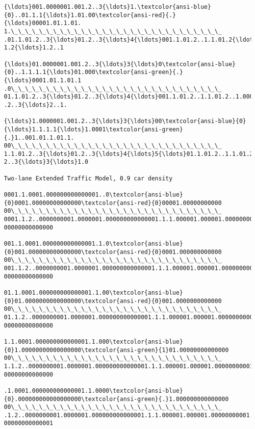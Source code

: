 \documentclass[11pt]{article}
\begin{document}
\begin{Verbatim}[commandchars=\\\{\},fontsize=\footnotesize]
{\ldots}001.0000001.001.2..3{\ldots}1.\textcolor{ansi-blue}{0}..01.1.1{\ldots}1.01.00\textcolor{ansi-red}{.}{\ldots}00001.01.1.01.
1.\_\_\_\_\_\_\_\_\_\_\_\_\_\_\_\_\_\_\_\_\_\_\_\_\_\_\_\_\_\_
.01.1.01.2..3{\ldots}01.2..3{\ldots}4{\ldots}001.1.01.2..1.1.01.2{\ldots}000001.1.0001.1.2..2..1.00
1.2{\ldots}1.2..1

{\ldots}01.0000001.001.2..3{\ldots}3{\ldots}0\textcolor{ansi-blue}{0}..1.1.1.1{\ldots}01.000\textcolor{ansi-green}{.}{\ldots}0001.01.1.01.1
.0\_\_\_\_\_\_\_\_\_\_\_\_\_\_\_\_\_\_\_\_\_\_\_\_\_\_\_\_\_\_
01.1.01.2..3{\ldots}01.2..3{\ldots}4{\ldots}001.1.01.2..1.1.01.2..1.00001.1.0001.1.2..2..1.001
.2..3{\ldots}2..1.

{\ldots}1.0000001.001.2..3{\ldots}3{\ldots}00\textcolor{ansi-blue}{0}{\ldots}1.1.1.1{\ldots}1.0001\textcolor{ansi-green}{.}1..001.01.1.01.1.
00\_\_\_\_\_\_\_\_\_\_\_\_\_\_\_\_\_\_\_\_\_\_\_\_\_\_\_\_\_\_
1.1.01.2..3{\ldots}01.2..3{\ldots}4{\ldots}5{\ldots}01.1.01.2..1.1.01.2..1.00001.1.0001.1.2..2..1.001.
2..3{\ldots}3{\ldots}1.0

Two-lane Extended Traffic Model, 0.9 car density

0001.1.0001.000000000000001..0\textcolor{ansi-blue}{0}0001.00000000000000\textcolor{ansi-red}{0}00001.00000000000
00\_\_\_\_\_\_\_\_\_\_\_\_\_\_\_\_\_\_\_\_\_\_\_\_\_\_\_\_\_\_
0001.1.2..0000000001.0000001.000000000000001.1.1.000001.000001.00000000001.1.000000000
00000000000000

001.1.0001.000000000000001.1.0\textcolor{ansi-blue}{0}001.000000000000000\textcolor{ansi-red}{0}0001.000000000000
00\_\_\_\_\_\_\_\_\_\_\_\_\_\_\_\_\_\_\_\_\_\_\_\_\_\_\_\_\_\_
001.1.2..0000000001.0000001.000000000000001.1.1.000001.000001.00000000001.1.0000000000
00000000000000

01.1.0001.000000000000001.1.00\textcolor{ansi-blue}{0}01.0000000000000000\textcolor{ansi-red}{0}001.0000000000000
00\_\_\_\_\_\_\_\_\_\_\_\_\_\_\_\_\_\_\_\_\_\_\_\_\_\_\_\_\_\_
01.1.2..0000000001.0000001.000000000000001.1.1.000001.000001.00000000001.1.00000000000
00000000000000

1.1.0001.000000000000001.1.000\textcolor{ansi-blue}{0}1.00000000000000000\textcolor{ansi-green}{1}01.00000000000000
00\_\_\_\_\_\_\_\_\_\_\_\_\_\_\_\_\_\_\_\_\_\_\_\_\_\_\_\_\_\_
1.1.2..0000000001.0000001.000000000000001.1.1.000001.000001.00000000001.1.000000000000
00000000000000

.1.0001.000000000000001.1.0000\textcolor{ansi-blue}{0}.000000000000000000\textcolor{ansi-green}{.}1.000000000000000
00\_\_\_\_\_\_\_\_\_\_\_\_\_\_\_\_\_\_\_\_\_\_\_\_\_\_\_\_\_\_
.1.2..0000000001.0000001.000000000000001.1.1.000001.000001.00000000001.1.0000000000000
00000000000001


    \end{Verbatim}
\end{document}
